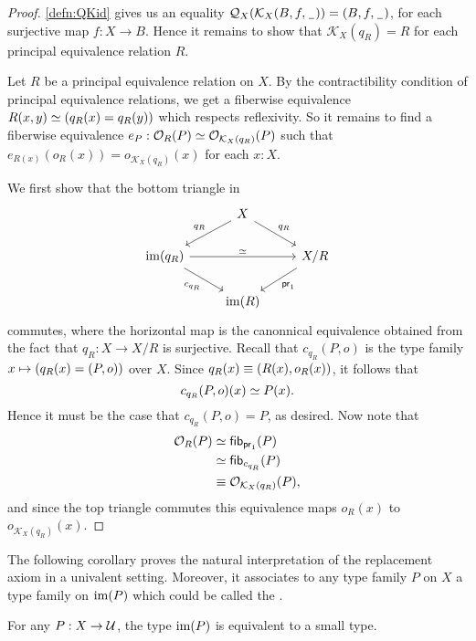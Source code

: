 \begin{proof}
\autoref{defn:QKid} gives us an equality $\mathcal{Q}_X(\mathcal{K}_X(B,f,\mathord{\hspace{1pt}\underline{\hspace{1ex}}\hspace{1pt}}))={\mathopen{}(B,f,\mathord{\hspace{1pt}\underline{\hspace{1ex}}\hspace{1pt}})\mathclose{}}$, for each surjective map $f:X\to B$. Hence it remains to show that $\mathcal{K}_X(q_R)=R$ for each principal equivalence relation $R$. 

Let $R$ be a principal equivalence relation on $X$. By the contractibility condition of principal equivalence relations, we get a fiberwise equivalence $\eqv{R(x,y)}{(q_R(x)=q_R(y))}$ which respects reflexivity.
So it remains to find a fiberwise equivalence $e_P:\eqv{\mathcal{O}_R(P)}{\mathcal{O}_{\mathcal{K}_X(q_R)}(P)}$ such that $e_{R(x)}(o_R(x))=o_{\mathcal{K}_X(q_R)}(x)$ for each $x:X$.

We first show that the bottom triangle in
\begin{equation*}
\begin{tikzcd} & X \arrow[dl,swap,"q_R"] \arrow[dr,"q_R"] \\
\im(q_R) \arrow[dr,swap,"c_{q_R}"] \arrow[rr,"\eqvsym"] & & X/R \arrow[dl,"\proj1"] \\
& \im(R)
\end{tikzcd}
\end{equation*}
commutes, where the horizontal map is the canonnical equivalence obtained from the fact that $q_R:X\to X/R$ is surjective. Recall that $c_{q_R}(P,o)$ is the type family $x\mapsto (q_R(x)={\mathopen{}(P,o)\mathclose{}})$ over $X$. Since $q_R(x)\equiv{\mathopen{}(R(x),o_R(x))\mathclose{}}$, it follows that
\begin{equation*}
c_{q_R}(P,o)(x)\simeq P(x).
\end{equation*}
Hence it must be the case that $c_{q_R}(P,o)=P$, as desired. Now note that 
\begin{align*}
\mathcal{O}_R(P)
& \simeq \mathsf{fib}_{\mathsf{pr}_{1}}(P) \\
& \simeq \mathsf{fib}_{c_{q_R}}(P) \\
& \equiv \mathcal{O}_{\mathcal{K}_X(q_R)}(P),
\end{align*}
and since the top triangle commutes this equivalence maps $o_R(x)$ to $o_{\mathcal{K}_X(q_R)}(x)$. 
\end{proof}

The following corollary proves the natural interpretation of the replacement axiom in a univalent setting. Moreover, it associates to any type family $P$ on $X$ a type family on $\operatorname{im}(P)$ which could be called the . 

\begin{cor}
For any $P:X\to\mathcal{U}$, the type $\operatorname{im}(P)$ is equivalent to a small type.
\end{cor}

